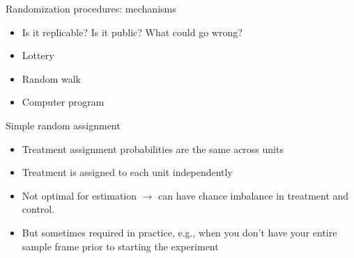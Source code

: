 \documentclass[xcolor={dvipsnames},handout]{beamer}
\begin{document}

\begin{frame}{Randomization procedures: mechanisms}

\begin{itemize}
\item Is it replicable?  Is it public?  What could go wrong?
\item Lottery
\item Random walk
\item Computer program
\end{itemize}

\end{frame}



\begin{frame}{Simple random assignment}

\begin{itemize}
\item Treatment assignment probabilities are the same across units
\item Treatment is assigned to each unit independently
\item Not optimal for estimation $\rightarrow$ can have chance imbalance in treatment and control.
\item But sometimes required in practice, e.g., when you don't have your entire sample frame prior to starting the experiment
\end{itemize}

\end{frame}


\end{document}
